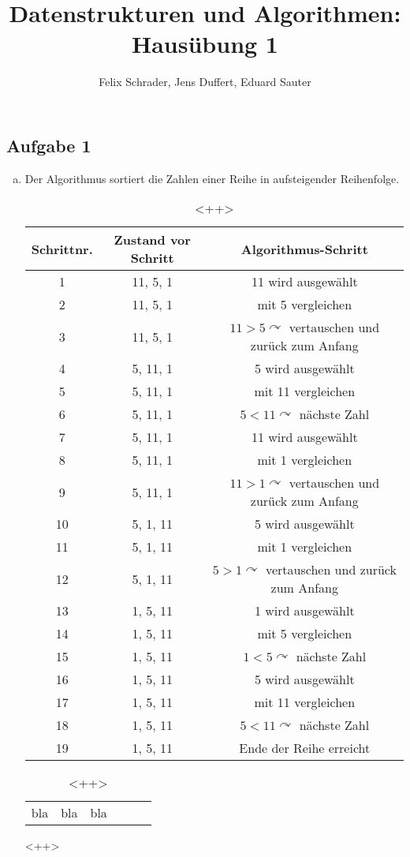 \documentclass[11pt]{article}
\author{Felix Schrader, Jens Duffert, Eduard Sauter}
\title{Datenstrukturen und Algorithmen: Haus\"ubung 1}
\begin{document}
\maketitle

\subsection*{Aufgabe 1}
\begin{enumerate}[a)]

\item Der Algorithmus sortiert die Zahlen einer Reihe in aufsteigender Reihenfolge.

\begin{table}[h!]
\centering
\begin{tabular}{|c|c|c|}
\hline 
Schrittnr. & Zustand vor Schritt & Algorithmus-Schritt \\ 
\hline 
1 & 11, 5, 1 & 11 wird ausgew\"ahlt \\ 
\hline 
2 & 11, 5, 1 & mit 5 vergleichen \\ 
\hline 
3 & 11, 5, 1 & $11>5\curvearrowright$ vertauschen und zur\"uck zum Anfang \\ 
\hline 
4 & 5, 11, 1 & 5 wird ausgew\"ahlt \\ 
\hline 
5 & 5, 11, 1 & mit 11 vergleichen \\ 
\hline 
6 & 5, 11, 1 & $5<11\curvearrowright$ n\"achste Zahl \\ 
\hline 
7 & 5, 11, 1 & 11 wird ausgew\"ahlt \\ 
\hline 
8 & 5, 11, 1 & mit 1 vergleichen \\ 
\hline 
9 & 5, 11, 1 & $11>1\curvearrowright$ vertauschen und zur\"uck zum Anfang \\ 
\hline 
10 & 5, 1, 11 & 5 wird ausgew\"ahlt \\ 
\hline 
11 & 5, 1, 11 & mit 1 vergleichen \\ 
\hline 
12 & 5, 1, 11 & $5>1\curvearrowright$ vertauschen und zur\"uck zum Anfang \\ 
\hline 
13 & 1, 5, 11 & 1 wird ausgew\"ahlt \\ 
\hline 
14 & 1, 5, 11 & mit 5 vergleichen \\ 
\hline 
15 & 1, 5, 11 & $1<5\curvearrowright$ n\"achste Zahl \\ 
\hline 
16 & 1, 5, 11 & 5 wird ausgew\"ahlt \\ 
\hline 
17 & 1, 5, 11 & mit 11 vergleichen \\ 
\hline 
18 & 1, 5, 11 & $5<11\curvearrowright$ n\"achste Zahl \\ 
\hline 
19 & 1, 5, 11 & Ende der Reihe erreicht \\ 
\hline 
\end{tabular} 
\begin{table}[htpb]
  \centering
  \begin{tabular}{c c c c c c}
    bla & bla & bla \\
  \end{tabular}
  \caption{<++>}
\end{table}
<++>
\end{table}


\end{enumerate}
\end{document}
